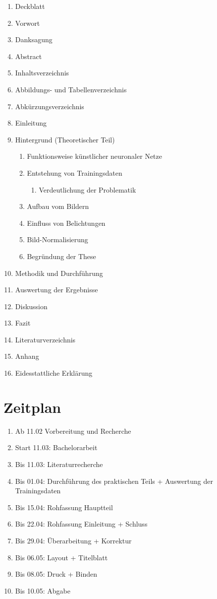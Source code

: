 \documentclass[a4paper,12pt,oneside]{article}
\begin{document}
  \begin{enumerate}
  \item Deckblatt
  \item Vorwort
  \item Danksagung
  \item Abstract
  \item Inhaltsverzeichnis
  \item Abbildungs- und Tabellenverzeichnis
  \item Abkürzungsverzeichnis
  \item Einleitung
  \item Hintergrund (Theoretischer Teil)
  \begin{enumerate}
  \item Funktionsweise künstlicher neuronaler Netze
  \item Entstehung von Trainingsdaten
  \begin{enumerate}
  \item Verdeutlichung der Problematik
  \end{enumerate}
  \item Aufbau vom Bildern
  \item Einfluss von Belichtungen
  \item Bild-Normalisierung
  \item Begründung der These
  \end{enumerate}
  \item Methodik und Durchführung
  \item Auswertung der Ergebnisse
  \item Diskussion
  \item Fazit
  \item Literaturverzeichnis
  \item Anhang
  \item Eidesstattliche Erklärung
  \end{enumerate}
  
  \newpage
  
  \section{Zeitplan}  
  
  \begin{enumerate}
  \item Ab 11.02     	Vorbereitung und Recherche
  \item Start 11.03: 	Bachelorarbeit
  \item Bis 11.03: 		Literaturrecherche
  \item Bis 01.04: 		Durchführung des praktischen Teils + Auswertung der Trainingsdaten
  \item Bis 15.04:		Rohfassung Hauptteil
  \item Bis 22.04:		Rohfassung Einleitung + Schluss
  \item Bis 29.04:		Überarbeitung + Korrektur
  \item Bis 06.05:		Layout + Titelblatt
  \item Bis 08.05:		Druck + Binden
  \item Bis 10.05:		Abgabe
  \end{enumerate}
  
\end{document}
